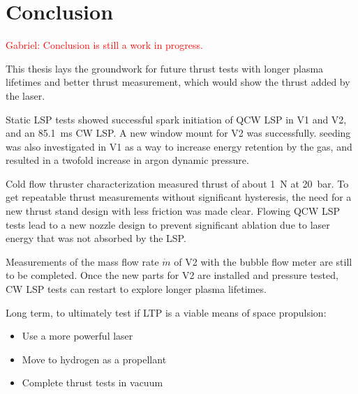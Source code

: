 \chapter{Conclusion}

    \textcolor{red}{Gabriel: Conclusion is still a work in progress.}

    This thesis lays the groundwork for future thrust tests with longer plasma lifetimes and better thrust measurement, which would show the thrust added by the laser.

    Static LSP tests showed successful spark initiation of QCW LSP in V1 and V2, and an \qty{85.1}{ms} CW LSP. A new window mount for V2 was successfully.  seeding was also investigated in V1 as a way to increase energy retention by the gas, and resulted in a twofold increase in argon dynamic pressure. 

    Cold flow thruster characterization measured thrust of about \qty{1}{N} at \qty{20}{bar}. To get repeatable thrust measurements without significant hysteresis, the need for a new thrust stand design with less friction was made clear. Flowing QCW LSP tests lead to a new nozzle design to prevent significant ablation due to laser energy that was not absorbed by the LSP. 
    
    Measurements of the mass flow rate $\dot m$ of V2 with the bubble flow meter are still to be completed. Once the new parts for V2 are installed and pressure tested, CW LSP tests can restart to explore longer plasma lifetimes.

    Long term, to ultimately test if LTP is a viable means of space propulsion:
    \begin{itemize}
        \item Use a more powerful laser
        \item Move to hydrogen as a propellant
        \item Complete thrust tests in vacuum
    \end{itemize}